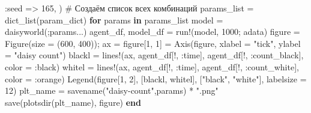 \documentclass[
  english,
  russian,
  12pt,
  a4paper,
  DIV=11,
  numbers=noendperiod]{scrreprt}
\newenvironment{Shaded}{\begin{snugshade}}{\end{snugshade}}
\newcommand{\CommentTok}[1]{\textcolor[rgb]{0.37,0.37,0.37}{#1}}
\newcommand{\ControlFlowTok}[1]{\textcolor[rgb]{0.00,0.23,0.31}{\textbf{#1}}}
\newcommand{\FloatTok}[1]{\textcolor[rgb]{0.68,0.00,0.00}{#1}}
\newcommand{\FunctionTok}[1]{\textcolor[rgb]{0.28,0.35,0.67}{#1}}
\newcommand{\KeywordTok}[1]{\textcolor[rgb]{0.00,0.23,0.31}{\textbf{#1}}}
\newcommand{\NormalTok}[1]{\textcolor[rgb]{0.00,0.23,0.31}{#1}}
\newcommand{\OperatorTok}[1]{\textcolor[rgb]{0.37,0.37,0.37}{#1}}
\newcommand{\StringTok}[1]{\textcolor[rgb]{0.13,0.47,0.30}{#1}}
\begin{document}
\begin{Shaded}
\begin{Highlighting}[]
\OperatorTok{:}\NormalTok{seed }\OperatorTok{=\textgreater{}} \FloatTok{165}\NormalTok{,}
\NormalTok{)}
\CommentTok{\# Создаём список всех комбинаций}
\NormalTok{params\_list }\OperatorTok{=} \FunctionTok{dict\_list}\NormalTok{(param\_dict)}
\ControlFlowTok{for}\NormalTok{ params }\KeywordTok{in}\NormalTok{ params\_list}
\NormalTok{model }\OperatorTok{=} \FunctionTok{daisyworld}\NormalTok{(;params}\OperatorTok{...}\NormalTok{)}
\NormalTok{agent\_df, model\_df }\OperatorTok{=} \FunctionTok{run!}\NormalTok{(model, }\FloatTok{1000}\NormalTok{; adata)}
\NormalTok{figure }\OperatorTok{=} \FunctionTok{Figure}\NormalTok{(size }\OperatorTok{=}\NormalTok{ (}\FloatTok{600}\NormalTok{, }\FloatTok{400}\NormalTok{));}
\NormalTok{ax }\OperatorTok{=}\NormalTok{ figure[}\FloatTok{1}\NormalTok{, }\FloatTok{1}\NormalTok{] }\OperatorTok{=} \FunctionTok{Axis}\NormalTok{(figure, xlabel }\OperatorTok{=} \StringTok{"tick"}\NormalTok{, ylabel }\OperatorTok{=} \StringTok{"daisy count"}\NormalTok{)}
\NormalTok{blackl }\OperatorTok{=} \FunctionTok{lines!}\NormalTok{(ax, agent\_df[!, }\OperatorTok{:}\NormalTok{time], agent\_df[!, }\OperatorTok{:}\NormalTok{count\_black], color }\OperatorTok{=} \OperatorTok{:}\NormalTok{black)}
\NormalTok{whitel }\OperatorTok{=} \FunctionTok{lines!}\NormalTok{(ax, agent\_df[!, }\OperatorTok{:}\NormalTok{time], agent\_df[!, }\OperatorTok{:}\NormalTok{count\_white], color }\OperatorTok{=} \OperatorTok{:}\NormalTok{orange)}
\FunctionTok{Legend}\NormalTok{(figure[}\FloatTok{1}\NormalTok{, }\FloatTok{2}\NormalTok{], [blackl, whitel], [}\StringTok{"black"}\NormalTok{, }\StringTok{"white"}\NormalTok{], labelsize }\OperatorTok{=} \FloatTok{12}\NormalTok{)}
\NormalTok{plt\_name }\OperatorTok{=} \FunctionTok{savename}\NormalTok{(}\StringTok{"daisy{-}count"}\NormalTok{,params) }\OperatorTok{*} \StringTok{".png"}
\FunctionTok{save}\NormalTok{(}\FunctionTok{plotsdir}\NormalTok{(plt\_name), figure)}
\ControlFlowTok{end}
\end{Highlighting}
\end{Shaded}
\end{document}
